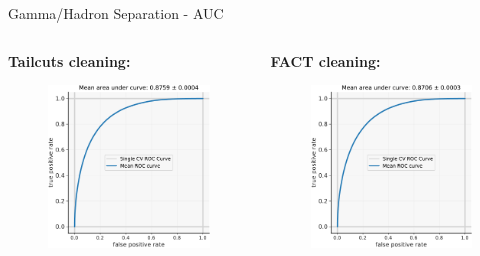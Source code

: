 \begin{frame}{Gamma/Hadron Separation - AUC}
    \begin{columns}[T] %
        \begin{column}{.48\textwidth}
            \textbf{Tailcuts cleaning:}
            \vspace{5pt}
            \begin{figure}
                \includegraphics[width=0.8\linewidth]{images/result_plots/tail1/sep_diff_1-crop.pdf}
            \end{figure}
        \end{column}
        \begin{column}{.48\textwidth}
            \textbf{FACT cleaning:}
            \vspace{5pt}
            \begin{figure}
                \includegraphics[width=0.8\linewidth]{images/result_plots/fact2/sep_diff_1-crop.pdf}
            \end{figure}
        \end{column}
    \end{columns}
\end{frame}

